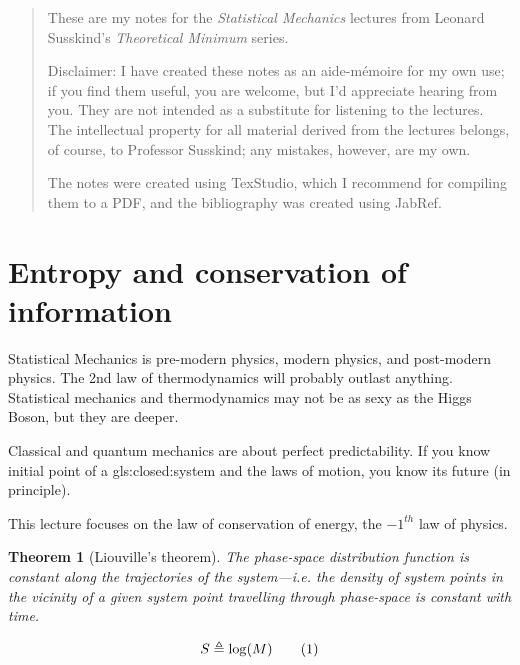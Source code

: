 \documentclass[]{article}
\newcommand\numberthis{\addtocounter{equation}{1}\tag{\theequation}}
\newtheorem{thm}{Theorem}
\begin{document}
\begin{abstract}
	These are my notes for the \emph{Statistical Mechanics} lectures\cite{susskind2013statistical} from Leonard Susskind's \emph{Theoretical Minimum} series\cite{susskind2007theoretical}.
	
	Disclaimer: I have created these notes as an aide-m\'emoire for my own use; if you find them useful, you are welcome, but I'd appreciate hearing from you. They are not intended 
	as a substitute for listening to the lectures. The intellectual property for all material derived from the lectures belongs, of course, to Professor Susskind; any mistakes, however, are my own.
	
	The notes were created using TexStudio\cite{TexStudio}, which I recommend for compiling them to a PDF, and the bibliography was created using JabRef\cite{Jabref}.
\end{abstract}

\tableofcontents

\listoffigures


\section{Entropy and conservation of information}

Statistical Mechanics is pre-modern physics, modern physics, and post-modern physics. The 2nd law of thermodynamics will probably outlast anything. Statistical mechanics and thermodynamics may not be as sexy as the Higgs Boson, but they are deeper.

Classical and quantum mechanics are about perfect predictability. If you know initial point of a \gls{gls:closed:system} and the laws of motion, you know its future (in principle).

This lecture focuses on the law of conservation of energy, the $-1^{th}$ law of physics. 

\begin{thm}[Liouville's theorem]
	The phase-space distribution function is constant along the trajectories of the system—i.e. the density of system points in the vicinity of a given system point travelling through phase-space is constant with time.
\end{thm}

\begin{align*}
S \triangleq \log(M) \numberthis \label{eq:entropy:simple}
\end{align*}
\end{document}
